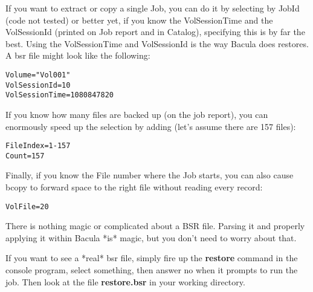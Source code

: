 If you want to extract or copy a single Job, you can do it by selecting by
JobId (code not tested) or better yet, if you know the VolSessionTime and the
VolSessionId (printed on Job report and in Catalog), specifying this is by far
the best. Using the VolSessionTime and VolSessionId is the way Bacula does
restores. A bsr file might look like the following: 

\footnotesize
\begin{verbatim}
Volume="Vol001"
VolSessionId=10
VolSessionTime=1080847820
\end{verbatim}
\normalsize

If you know how many files are backed up (on the job report), you can
enormously speed up the selection by adding (let's assume there are 157
files): 

\footnotesize
\begin{verbatim}
FileIndex=1-157
Count=157
\end{verbatim}
\normalsize

Finally, if you know the File number where the Job starts, you can also cause
bcopy to forward space to the right file without reading every record: 

\footnotesize
\begin{verbatim}
VolFile=20
\end{verbatim}
\normalsize

There is nothing magic or complicated about a BSR file. Parsing it and
properly applying it within Bacula *is* magic, but you don't need to worry
about that. 

If you want to see a *real* bsr file, simply fire up the {\bf restore} command
in the console program, select something, then answer no when it prompts to
run the job. Then look at the file {\bf restore.bsr} in your working
directory. 
